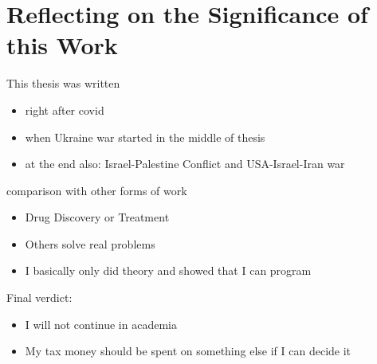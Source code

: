 \pagebreak
\section{Reflecting on the Significance of this Work}

This thesis was written
\begin{itemize}
    \item right after covid
    \item when Ukraine war started in the middle of thesis
    \item at the end also: Israel-Palestine Conflict and USA-Israel-Iran war
\end{itemize}

comparison with other forms of work
\begin{itemize}
    \item Drug Discovery or Treatment
    \item Others solve real problems
    \item I basically only did theory and showed that I can program
\end{itemize}

Final verdict:
\begin{itemize}
    \item I will not continue in academia
    \item My tax money should be spent on something else if I can decide it
\end{itemize}
